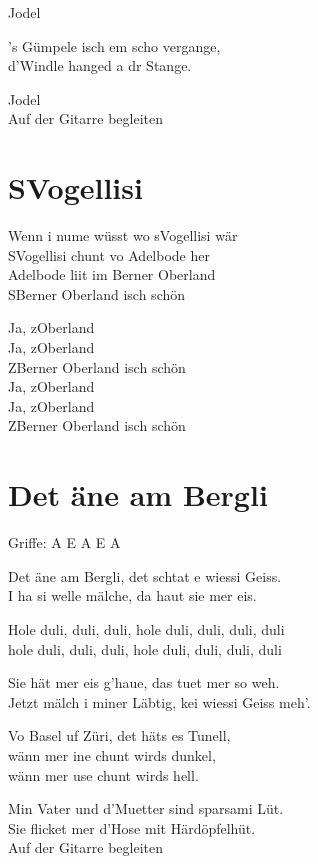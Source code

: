 \documentclass[
  letterpaper,
]{scrbook}
\begin{document}
Jodel

's Gümpele isch em scho vergange,\\
d'Windle hanged a dr Stange.

Jodel\\
Auf der Gitarre begleiten

\hypertarget{svogellisi}{%
\chapter{S\textquotesingle Vogellisi}\label{svogellisi}}

Wenn i nume wüsst wo s\textquotesingle Vogellisi wär\\
S\textquotesingle Vogellisi chunt vo Adelbode her\\
Adelbode liit im Berner Oberland\\
S\textquotesingle Berner Oberland isch schön

Ja, z\textquotesingle Oberland\\
Ja, z\textquotesingle Oberland\\
Z\textquotesingle Berner Oberland isch schön\\
Ja, z\textquotesingle Oberland\\
Ja, z\textquotesingle Oberland\\
Z\textquotesingle Berner Oberland isch schön

\hypertarget{det-uxe4ne-am-bergli}{%
\chapter{Det äne am Bergli}\label{det-uxe4ne-am-bergli}}

Griffe: A E A E A

Det äne am Bergli, det schtat e wiessi Geiss.\\
I ha si welle mälche, da haut sie mer eis.

Hole duli, duli, duli, hole duli, duli, duli, duli\\
hole duli, duli, duli, hole duli, duli, duli, duli

Sie hät mer eis g'haue, das tuet mer so weh.\\
Jetzt mälch i miner Läbtig, kei wiessi Geiss meh'.

Vo Basel uf Züri, det häts es Tunell,\\
wänn mer ine chunt wirds dunkel,\\
wänn mer use chunt wirds hell.

Min Vater und d'Muetter sind sparsami Lüt.\\
Sie flicket mer d'Hose mit Härdöpfelhüt.\\
Auf der Gitarre begleiten


\backmatter
\end{document}
